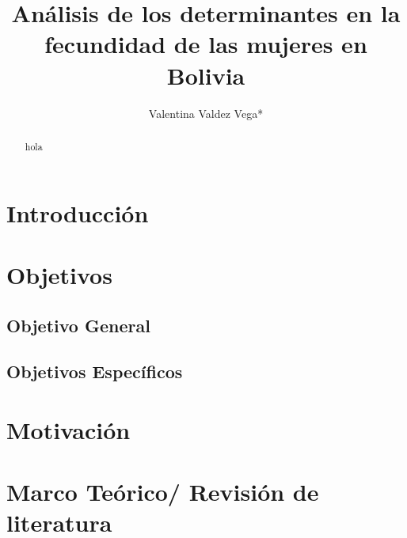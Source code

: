 \documentclass[Royal,times,sageh]{sagej}
\begin{document}

\title{Análisis de los determinantes en la fecundidad de las mujeres en
Bolivia}


\author{Valentina Valdez Vega*}




\begin{abstract}
hola
\end{abstract}


\maketitle

\section{Introducción}\label{introducciuxf3n}

\section{Objetivos}\label{objetivos}

\subsection{Objetivo General}\label{objetivo-general}

\subsection{Objetivos Específicos}\label{objetivos-especuxedficos}

\section{Motivación}\label{motivaciuxf3n}

\section{Marco Teórico/ Revisión de
literatura}\label{marco-teuxf3rico-revisiuxf3n-de-literatura}
\end{document}
